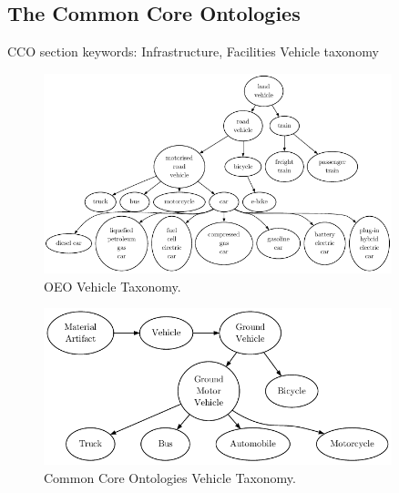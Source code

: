 \subsection{The Common Core Ontologies}

CCO section keywords: Infrastructure, Facilities Vehicle taxonomy

\begin{figure}[h]\label{landvehicletaxoeo}
    \caption{OEO Vehicle Taxonomy.}
    \centering
    \includegraphics[width=0.9\textwidth]{images/OEOLVehicles}
\end{figure}

\begin{figure}[h]
    \caption{Common Core Ontologies Vehicle Taxonomy.}
    \centering
    \includegraphics[width=0.9\textwidth]{images/CCOVehicles}
\end{figure}


